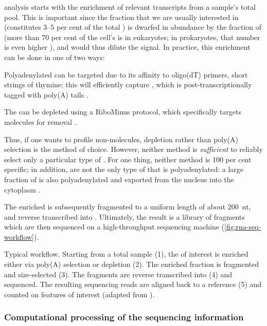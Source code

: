 \rnaseq analysis starts with the enrichment of relevant transcripts from a
sample’s total \rna pool. This is important since the \rna fraction that we are
usually interested in (\mrna constitutes \numrange{3}{5} per cent of the total
\rna \citep{Alberts:2002}) is dwarfed in abundance by the fraction of \rrna
(more than \num{70} per cent of the cell’s \rna is \rrna in eukaryotes; in
prokaryotes, that number is even higher \citep{Sittman:1999}), and would thus
dilute the signal. In practice, this enrichment can be done in one of two ways:
\begin{enumerate*}
    \item Polyadenylated \rna can be targeted due to its affinity to oligo(dT)
        primers, short strings of thymine; this will efficiently capture \mrna,
        which is post-transcriptionally \threep tagged with poly(A)
        tails \citep{Mortazavi:2008}.
    \item The \rna can be \rrna depleted using a RiboMinus protocol, which
        specifically targets \rrna molecules for removal \citep{Cui:2010}.
\end{enumerate*}
Thus, if one wants to profile non-\mrna molecules, \rrna depletion rather than
poly(A) selection is the method of choice. However, neither method is
\emph{sufficient} to reliably select only a particular type of \rna. For one
thing, neither method is \num{100} per cent specific; in addition, \mrna[s] are
not the only type of \rna that is polyadenylated: a large fraction of \ncrna is
also polyadenylated and exported from the nucleus into the cytoplasm
\citep{Cheng:2005}.

The enriched \rna is subsequently fragmented to a uniform length of about
\SI{200}{nt}, and reverse transcribed into \cdna. Ultimately, the result is a
\cdna library of fragments which are then sequenced on a high-throughput
sequencing machine (\cref{fig:rna-seq-workflow}).

    {Typical \rnaseq workflow.}
    {Starting from a total \rna sample (\num{1}), the \rna of interest is
    enriched either via poly(A) selection or \rrna depletion (\num{2}). The
    enriched fraction is fragmented and size-selected (\num{3}). The fragments
    are reverse transcribed into \cdna (\num{4}) and sequenced. The resulting
    sequencing reads are aligned back to a reference (\num{5}) and counted on
    features of interest (adapted from \citet{Mortazavi:2008}).}

\subsubsection{Computational processing of the sequencing information}


